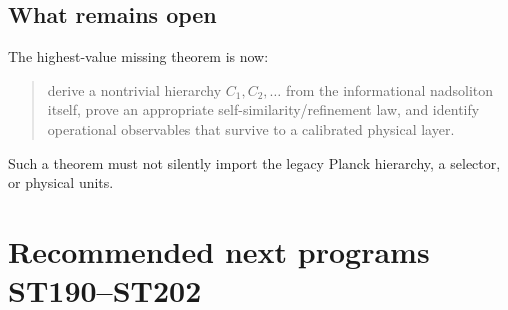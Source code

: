 \documentclass[11pt,a4paper]{article}
\begin{document}
\subsection{What remains open}

The highest-value missing theorem is now:
\begin{quote}
derive a nontrivial hierarchy $C_1,C_2,\ldots$ from the informational nadsoliton itself, prove an appropriate self-similarity/refinement law, and identify operational observables that survive to a calibrated physical layer.
\end{quote}
Such a theorem must not silently import the legacy Planck hierarchy, a selector, or physical units.

\section{Recommended next programs ST190--ST202}
\end{document}
